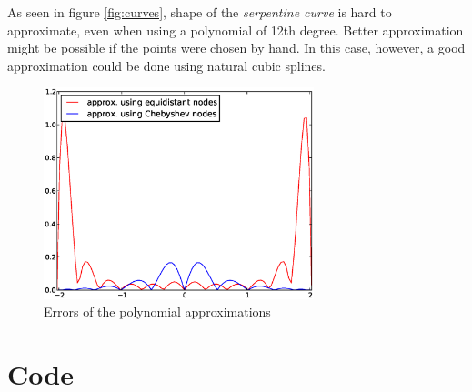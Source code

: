 \documentclass[a4paper,12pt]{scrartcl}
\begin{document}
As seen in figure \ref{fig:curves}, shape of the \emph{serpentine curve} is hard to approximate, even when using a polynomial of 12th degree. Better approximation might be possible if the points were chosen by hand. In this case, however, a good approximation could be done using natural cubic splines.
\begin{figure}[h!]
  \centering
    \includegraphics[width=0.7\textwidth]{errors}
  \caption{Errors of the polynomial approximations}
  \label{fig:errors}
\end{figure}
\clearpage
\appendix
\lstset{basicstyle=\ttfamily, numbers=left, numberstyle=\tiny, stepnumber=1, numbersep=5pt}
\gdef\thesection{Appendix \arabic{section}.}
\clearpage

\section{Code\label{LiiteA}}

\end{document}
